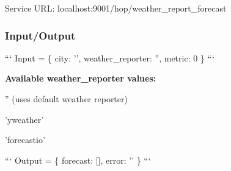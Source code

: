 Service U\-R\-L\-: {\ttfamily localhost\-:9001/hop/weather\-\_\-report\-\_\-forecast}

\subsubsection*{Input/\-Output}

``` Input = \{ city\-: '', weather\-\_\-reporter\-: '', metric\-: 0 \} ```

{\bfseries Available weather\-\_\-reporter values\-:}
\begin{DoxyItemize}
\item '' (uses default weather reporter)
\item 'yweather'
\item 'forecastio'
\end{DoxyItemize}

``` Output = \{ forecast\-: \mbox{[}\mbox{]}, error\-: '' \} ``` 